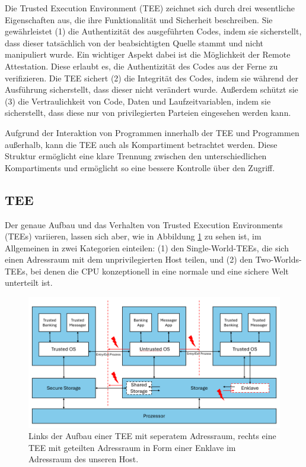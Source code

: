 Die Trusted Execution Environment (TEE) zeichnet sich durch drei wesentliche Eigenschaften aus, die ihre Funktionalität und Sicherheit beschreiben. 
Sie gewährleistet (1) die Authentizität des ausgeführten Codes, indem sie sicherstellt, dass dieser tatsächlich von der beabsichtigten Quelle stammt und nicht manipuliert wurde. 
Ein wichtiger Aspekt dabei ist die Möglichkeit der Remote Attestation. Diese erlaubt es, die Authentizität des Codes aus der Ferne zu verifizieren. 
Die TEE sichert (2) die Integrität des Codes, indem sie während der Ausführung sicherstellt, dass dieser nicht verändert wurde. Außerdem schützt sie (3) die Vertraulichkeit von Code, Daten und Laufzeitvariablen, indem sie sicherstellt, dass diese nur von privilegierten Parteien eingesehen werden kann\cite{Trusted}.

Aufgrund der Interaktion von Programmen innerhalb der TEE und Programmen außerhalb, kann die TEE auch als Kompartiment betrachtet werden. Diese Struktur ermöglicht eine klare Trennung zwischen den unterschiedlichen Kompartiments und ermöglicht so eine bessere Kontrolle über den Zugriff.

\subsection{TEE}
Der genaue Aufbau und das Verhalten von Trusted Execution Environments (TEEs) variieren, lassen sich aber, wie in Abbildung \ref{fig:TEE} zu sehen ist, im Allgemeinen in zwei Kategorien einteilen: (1) den Single-World-TEEs, die sich einen Adressraum mit dem unprivilegierten Host teilen, und (2) den Two-Worlds-TEEs, bei denen die CPU konzeptionell in eine normale und eine sichere Welt unterteilt ist\cite{TEEPaper}.

\begin{figure}[h]
    \centering
    \includegraphics[width=\linewidth]{Grafiken/TEE-Grafik.png}
    \caption{Links der Aufbau einer TEE mit seperatem Adressraum, rechts eine TEE mit geteilten Adressraum in Form einer Enklave im Adressraum des unseren Host.}
    \label{fig:TEE}
\end{figure}

